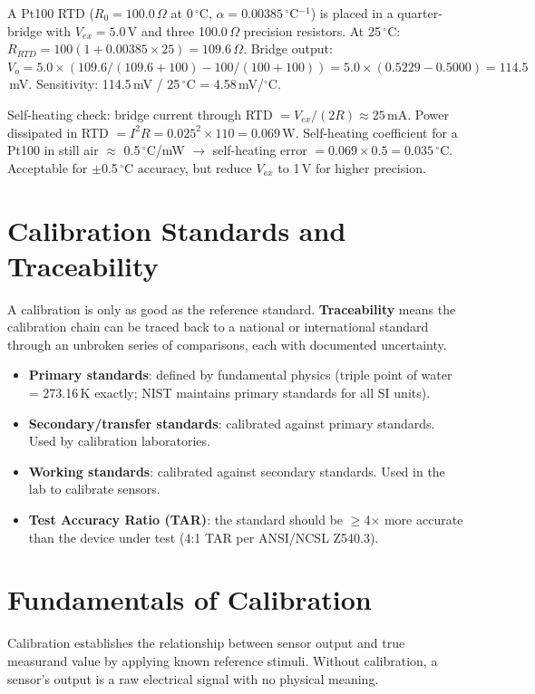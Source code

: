 \documentclass[11pt,letterpaper,twoside,openany]{book}
\newcommand{\degC}{\ensuremath{{}^{\circ}\text{C}}}
\begin{document}
\begin{examplebox}
A Pt100 RTD ($R_0 = 100.0\,\Omega$ at 0\,\degC{}, $\alpha = 0.00385$\,\degC{}$^{-1}$) is placed in a quarter-bridge with $V_{ex} = 5.0$\,V and three 100.0\,$\Omega$ precision resistors. At 25\,\degC{}: $R_{RTD} = 100(1 + 0.00385 \times 25) = 109.6\,\Omega$. Bridge output: $V_o = 5.0 \times (109.6/(109.6+100) - 100/(100+100)) = 5.0 \times (0.5229 - 0.5000) = 114.5$\,mV. Sensitivity: 114.5\,mV / 25\,\degC{} = 4.58\,mV/\degC{}.

Self-heating check: bridge current through RTD $= V_{ex}/(2R) \approx 25$\,mA. Power dissipated in RTD $= I^2 R = 0.025^2 \times 110 = 0.069$\,W. Self-heating coefficient for a Pt100 in still air $\approx$ 0.5\,\degC{}/mW $\to$ self-heating error $= 0.069 \times 0.5 = 0.035$\,\degC{}. Acceptable for $\pm$0.5\,\degC{} accuracy, but reduce $V_{ex}$ to 1\,V for higher precision.
\end{examplebox}

\section{Calibration Standards and Traceability}
A calibration is only as good as the reference standard. \textbf{Traceability} means the calibration chain can be traced back to a national or international standard through an unbroken series of comparisons, each with documented uncertainty.

\begin{itemize}[leftmargin=1.5em]
\item \textbf{Primary standards}: defined by fundamental physics (triple point of water = 273.16\,K exactly; NIST maintains primary standards for all SI units).
\item \textbf{Secondary/transfer standards}: calibrated against primary standards. Used by calibration laboratories.
\item \textbf{Working standards}: calibrated against secondary standards. Used in the lab to calibrate sensors.
\item \textbf{Test Accuracy Ratio (TAR)}: the standard should be $\geq$4$\times$ more accurate than the device under test (4:1 TAR per ANSI/NCSL Z540.3).
\end{itemize}


\section{Fundamentals of Calibration}
Calibration establishes the relationship between sensor output and true measurand value by applying known reference stimuli. Without calibration, a sensor's output is a raw electrical signal with no physical meaning.
\end{document}
